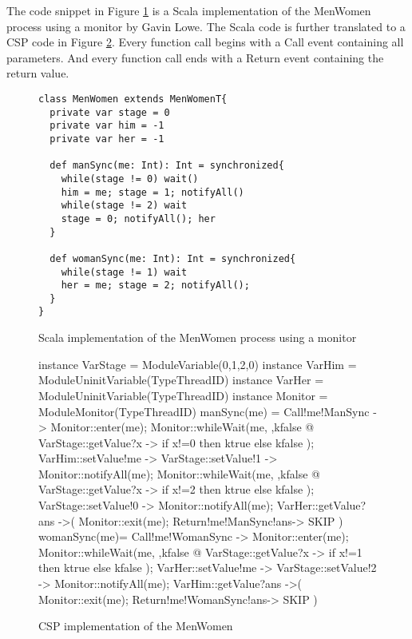 \documentclass{article}
\begin{document}
The code snippet in Figure \ref{menwomen.scala.correct} is a Scala implementation of the MenWomen process using a monitor by Gavin Lowe. The Scala code is further translated to a CSP code in Figure \ref{menwomen.csp.correct}. Every function call begins with a Call event containing all parameters. And every function call ends with a Return event containing the return value.

\begin{figure}[hbtp]
\begin{verbatim}
class MenWomen extends MenWomenT{
  private var stage = 0
  private var him = -1
  private var her = -1

  def manSync(me: Int): Int = synchronized{
    while(stage != 0) wait()         
    him = me; stage = 1; notifyAll() 
    while(stage != 2) wait
    stage = 0; notifyAll(); her
  }

  def womanSync(me: Int): Int = synchronized{
    while(stage != 1) wait
    her = me; stage = 2; notifyAll();
  }
}
\end{verbatim}
\caption{Scala implementation of the MenWomen process using a monitor}
\label{menwomen.scala.correct}
\end{figure}

\begin{figure}[hbtp]
\begin{cspm}
instance VarStage = ModuleVariable({0,1,2},0) 
instance VarHim = ModuleUninitVariable(TypeThreadID)
instance VarHer = ModuleUninitVariable(TypeThreadID)
instance Monitor = ModuleMonitor(TypeThreadID)
manSync(me) = 
  Call!me!ManSync ->
  Monitor::enter(me);
    Monitor::whileWait(me, \ktrue,kfalse @
      VarStage::getValue?x ->
      if x!=0 then ktrue else kfalse
    );
    VarHim::setValue!me ->
    VarStage::setValue!1 ->
    Monitor::notifyAll(me);
    Monitor::whileWait(me, \ktrue,kfalse @
      VarStage::getValue?x ->
      if x!=2 then ktrue else kfalse
    );
    VarStage::setValue!0 ->
    Monitor::notifyAll(me);
    VarHer::getValue?ans ->(
  Monitor::exit(me);
  Return!me!ManSync!ans->
  SKIP
  )
womanSync(me)=
  Call!me!WomanSync ->
  Monitor::enter(me);
    Monitor::whileWait(me, \ktrue,kfalse @
      VarStage::getValue?x ->
      if x!=1 then ktrue else kfalse
    );
    VarHer::setValue!me ->
    VarStage::setValue!2 ->
    Monitor::notifyAll(me);
    VarHim::getValue?ans ->(
  Monitor::exit(me);
  Return!me!WomanSync!ans->
  SKIP
  )
\end{cspm}
\caption{CSP implementation of the MenWomen}
\label{menwomen.csp.correct}
\end{figure}
\end{document}

